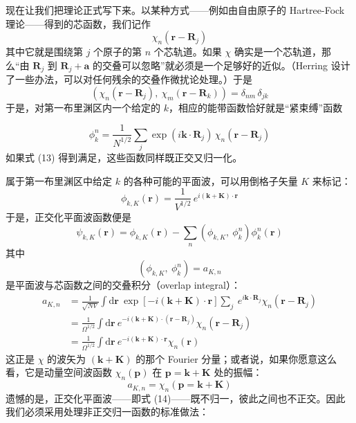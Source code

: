 现在让我们把理论正式写下来。以某种方式——例如由自由原子的 Hartree-Fock 理论——得到的芯函数，我们记作
\begin{equation*}
\chi_n(\mathbf{r}-\mathbf{R}_j)
\end{equation*}
其中它就是围绕第 $j$ 个原子的第 $n$ 个芯轨道。如果 $\chi$ 确实是一个芯轨道，那么“由 $\mathbf{R}_j$ 到 $\mathbf{R}_j+\mathbf{a}$ 的交叠可以忽略”就必须是一个足够好的近似。（Herring 设计了一些办法，可以对任何残余的交叠作微扰论处理。）于是
\begin{equation*}
\left(\chi_n(\mathbf{r}-\mathbf{R}_j),\ \chi_m(\mathbf{r}-\mathbf{R}_k)\right)=\delta_{nm}\,\delta_{jk}\tag{13}
\end{equation*}
于是，对第一布里渊区内一个给定的 $k$，相应的能带函数恰好就是“紧束缚”函数

\begin{equation*}
\phi_k^n=\frac{1}{N^{1/2}}\sum_j \exp(i\mathbf{k}\cdot\mathbf{R}_j)\,\chi_n(\mathbf{r}-\mathbf{R}_j)
\end{equation*}
如果式 (13) 得到满足，这些函数同样既正交又归一化。

属于第一布里渊区中给定 $k$ 的各种可能的平面波，可以用倒格子矢量 $K$ 来标记：
\begin{equation*}
\phi_{k,K}(\mathbf{r})=\frac{1}{V^{1/2}}\,e^{i(\mathbf{k}+\mathbf{K})\cdot\mathbf{r}}
\end{equation*}
于是，正交化平面波函数便是
\begin{equation*}
\psi_{k,K}(\mathbf{r})=\phi_{k,K}(\mathbf{r})-\sum_n\left(\phi_{k,K},\ \phi_k^n\right)\phi_k^n(\mathbf{r})\tag{14}
\end{equation*}
其中
\begin{equation*}
\left(\phi_{k,K},\ \phi_k^n\right)=a_{K,n}\tag{15}
\end{equation*}
是平面波与芯函数之间的交叠积分（overlap integral）：
\begin{align*}
a_{K,n}&=\frac{1}{\sqrt{NV}}\int \mathrm{d}\mathbf{r}\ \exp\left[-i(\mathbf{k}+\mathbf{K})\cdot\mathbf{r}\right]\sum_j\ e^{i\mathbf{k}\cdot\mathbf{R}_j}\chi_n(\mathbf{r}-\mathbf{R}_j)\\
&=\frac{1}{\Omega^{1/2}}\int \mathrm{d}\mathbf{r}\ e^{-i(\mathbf{k}+\mathbf{K})\cdot(\mathbf{r}-\mathbf{R}_j)}\chi_n(\mathbf{r}-\mathbf{R}_j)\\
&=\frac{1}{\Omega^{1/2}}\int \mathrm{d}\mathbf{r}\ e^{-i(\mathbf{k}+\mathbf{K})\cdot\mathbf{r}}\chi_n(\mathbf{r})
\end{align*}
这正是 $\chi$ 的波矢为 $(\mathbf{k}+\mathbf{K})$ 的那个 Fourier 分量；或者说，如果你愿意这么看，它是动量空间波函数 $\chi_n(\mathbf{p})$ 在 $\mathbf{p}=\mathbf{k}+\mathbf{K}$ 处的振幅：
\begin{equation*}
a_{K,n}=\chi_n(\mathbf{p}=\mathbf{k}+\mathbf{K})
\end{equation*}
遗憾的是，正交化平面波——即式 (14)——既不归一，彼此之间也不正交。因此我们必须采用处理非正交归一函数的标准做法：

